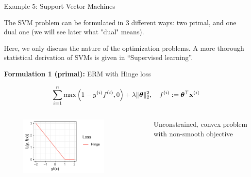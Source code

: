 \documentclass[11pt,compress,t,notes=noshow, xcolor=table]{beamer}
\begin{document}
\begin{vbframe}{Example 5: Support Vector Machines} 

The SVM problem can be formulated in $3$ different ways: two primal, and one dual one (we will see later what "dual" means). 

\begin{footnotesize}
	Here, we only discuss the nature of the optimization problems. A more thorough statistical derivation of SVMs is given in ``Supervised learning''. 
\end{footnotesize}

\vspace*{0.3cm}

\textbf{Formulation 1 (primal): } ERM with Hinge loss

$$
	\sum\limits_{i=1}^n \max\left(1 - y^{(i)} f^{(i)}, 0\right) + \lambda \|\bm{\theta}\|_2^2, \quad f^{(i)} := \bm{\theta}^\top \mathbf{x}^{(i)}
$$

\vspace*{-0.3cm}

\begin{columns}[T] %
	\begin{column}{.58\textwidth}
		\begin{figure}
			\begin{center}
				\includegraphics[width=0.8\textwidth]{figure_man/hinge.pdf}
			\end{center}
		\end{figure}
	\end{column}
	\begin{column}{.38\textwidth} \vspace*{1.5cm}
		\begin{footnotesize}
		Unconstrained, convex problem with non-smooth objective
		\end{footnotesize}
	\end{column}
\end{columns}


\end{vbframe}
\end{document}
